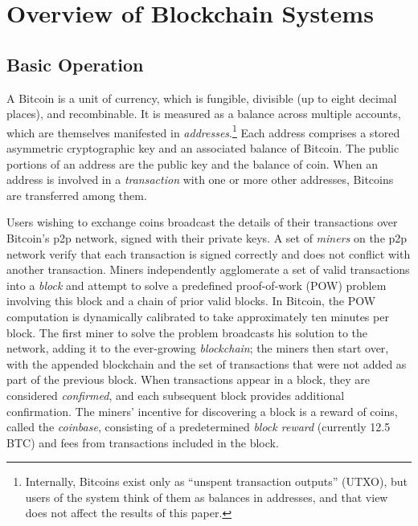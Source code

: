 \chapter{Overview of Blockchain Systems}

\section{Basic Operation}

 A Bitcoin is a unit of currency, which is
fungible, divisible (up to eight decimal places), and recombinable.
It is measured as a balance across multiple accounts, which are
themselves manifested in \emph{addresses}.$\!$\footnote{Internally,
  Bitcoins exist only as ``unspent transaction outputs'' (UTXO), but
  users of the system think of them as balances in addresses, and that
  view does not affect the results of this paper.  } Each address
comprises a stored asymmetric cryptographic key and an associated
balance of Bitcoin. The public portions of an address are the public
key and the balance of coin. When an address is involved in a
\emph{transaction} with one or more other addresses, Bitcoins are
transferred among them.

 Users wishing to exchange coins broadcast the details of
their transactions over Bitcoin's p2p network, signed with their
private keys. A set of \emph{miners} on the p2p network verify that
each transaction is signed correctly and does not conflict with
another transaction. Miners independently agglomerate a set of valid
transactions into a \emph{block} and attempt to solve a predefined
proof-of-work (POW) problem involving this block and a chain of prior
valid blocks. In Bitcoin, the POW computation is dynamically
calibrated to take approximately ten minutes per block. The first
miner to solve the problem broadcasts his solution to the network,
adding it to the ever-growing \emph{blockchain}; the miners then start
over, with the appended blockchain and the set of transactions that
were not added as part of the previous block. When transactions appear
in a block, they are considered \emph{confirmed}, and each subsequent
block provides additional confirmation. The miners' incentive for
discovering a block is a reward of coins, called the {\em coinbase},
consisting of a predetermined {\em block reward} (currently 12.5 BTC)
and fees from transactions included in the block.

